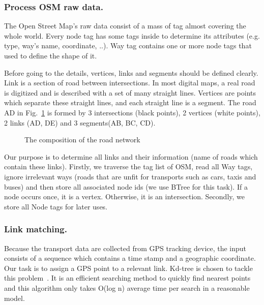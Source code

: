 \documentclass{acm_proc_article-sp}
\begin{document}
\subsubsection{Process OSM raw data.} \label{ssec:links}
	The Open Street Map's raw data consist of a mass of tag almost covering the whole world. Every node tag has some tags inside to determine its attributes (e.g. type, way's name, coordinate, ..). Way tag contains one or more node tags that used to define the shape of it.
	
		\setlength{\parindent}{0.7cm} Before going to the details, vertices, links and segments should be defined clearly. Link is a section of road between intersections. In most digital maps, a real road is digitized and is described with a set of many straight lines. Vertices are points which separate these straight lines, and each straight line is a segment. The road AD in Fig.~\ref{fig:composition} is formed by 3 intersections (black points), 2 vertices (white points), 2 links (AD, DE) and 3 segments(AB, BC, CD).
		
\begin{figure}[h]
\centering
{}
\caption{The composition of the road network}
\label{fig:composition}
\end{figure}
	
		\setlength{\parindent}{0.7cm} Our purpose is to determine all links and their information (name of roads which contain these links). Firstly, we traverse the tag list of OSM, read all Way tags, ignore irrelevant ways (roads that are unfit for transports such as cars, taxis and buses) and then store all associated node ids (we use BTree for this task). If a node occurs once, it is a vertex. Otherwise, it is an intersection. Secondly, we store all Node tags for later uses.
	
\subsubsection{Link matching.}
	
	Because the transport data are collected from GPS tracking device, the input consists of a sequence which contains a time stamp and a geographic coordinate. Our task is to assign a GPS point to a relevant link. Kd-tree is chosen to tackle this problem~\cite{moh2013approximate}. It is an efficient searching method to quickly find nearest points and this algorithm only takes O(log n) average time per search in a reasonable model.
	
\end{document}
